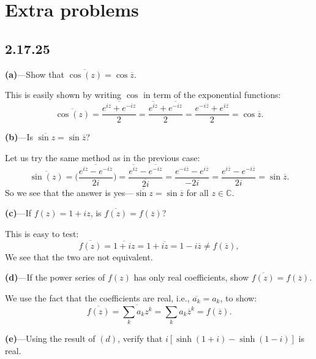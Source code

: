 \documentclass[a4paper, 11pt, titlepage, english]{article}
\begin{document}
\clearpage

\section*{Extra problems}
\subsection*{2.17.25}
\textbf{(a)}---Show that $\overline{\cos(z)} = \cos \overline{z}$.

This is easily shown by writing $\cos$ in term of the exponential functions:
$$\overline{\cos(z)} = \overline{\frac{e^{iz} + e^{-iz}}{2}} = \frac{\overline{e^{iz}} + \overline{e^{-iz}}}{2} = \frac{e^{-i\overline{z}}+ e^{i\overline{z}}}{2} = \cos \overline{z}.$$

\vspace{0.5cm}

\textbf{(b)}---Is $\overline{\sin z} = \sin \overline{z}$?

Let us try the same method as in the previous case:
$$\overline{\sin(z)} = \overline{\bigg(\frac{e^{iz} - e^{-iz}}{2i}\bigg)} = \frac{\overline{e^{iz}} - \overline{e^{-iz}}}{\overline{2i}} = \frac{e^{-i\overline{z}}- e^{i\overline{z}}}{-2i} = \frac{e^{i\overline{z}}-e^{-i\overline{z}}}{2i} = \sin \overline{z}.$$
So we see that the answer is yes---$\overline{\sin z} = \sin \overline{z}$ for all $z\in\mathbb{C}$.

\vspace{1cm}

\textbf{(c)}---If $f(z) = 1 + iz$, is $\overline{f(z)} = f(\overline{z})$?

This is easy to test:
$$\overline{f(z)} = \overline{1 + iz} = 1 + \overline{iz} = 1 - i\overline{z} \neq f(\overline{z}),$$
We see that the two are not equivalent.

\vspace{1cm}

\textbf{(d)}---If the power series of $f(z)$ has only real coefficients, show $\overline{f(z)} = f(\overline{z})$.

We use the fact that the coefficients are real, i.e., $\overline{a_k} = a_k$, to show:
$$\overline{f(z)} = \overline{\sum_k a_k z^k} = \sum_k a_k \overline{z}^k = f(\overline{z}).$$

\vspace{0.5cm}

\textbf{(e)}---Using the result of $(d)$, verify that $i[\sinh(1+i) - \sinh(1-i)]$ is real.
\end{document}
